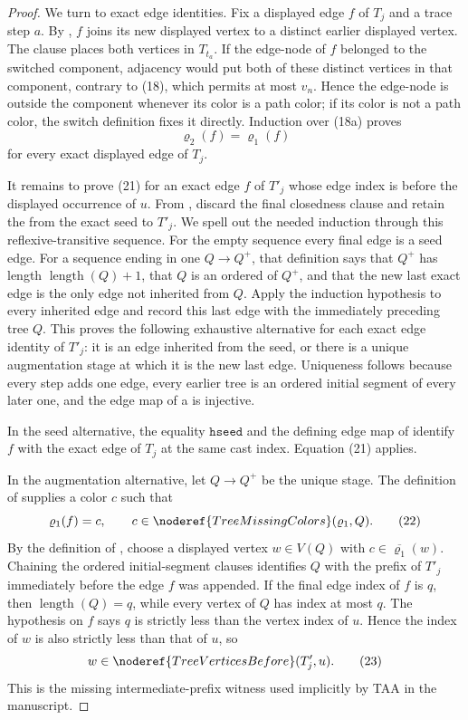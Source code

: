 \begin{proof}
We turn to exact edge identities.  Fix a displayed edge \(f\) of \(T_j\)
and a trace step \(a\).  By , \(f\) joins its new
displayed vertex to a distinct earlier displayed vertex.  The
 clause places both vertices in
\(T_{t_a}\).  If the edge-node of \(f\) belonged to the switched
component, adjacency would put both of these distinct vertices in that
component, contrary to (18), which permits at most \(v_n\).  Hence the
edge-node is outside the component whenever its color is a path color;
if its color is not a path color, the switch definition fixes it directly.
Induction over (18a) proves
\[
                    \varrho_2(f)=\varrho_1(f)               \tag{21}
\]
for every exact displayed edge of \(T_j\).

It remains to prove (21) for an exact edge \(f\) of \(T'_j\) whose edge
index is before the displayed occurrence of \(u\).  From
, discard the final closedness clause and retain
the  from the exact seed to
\(T'_j\).  We spell out the needed induction through this
reflexive-transitive sequence.  For the empty sequence every final edge
is a seed edge.  For a sequence ending in one
 \(Q\to Q^+\), that definition says that
\(Q^+\) has length \(\operatorname{length}(Q)+1\), that \(Q\) is an
ordered  of \(Q^+\), and that the
new last exact edge is the only edge not inherited from \(Q\).  Apply the
induction hypothesis to every inherited edge and record this last edge
with the immediately preceding tree \(Q\).  This proves the following
exhaustive alternative for each exact edge identity of \(T'_j\): it is an
edge inherited from the seed, or there is a unique augmentation stage at
which it is the new last edge.  Uniqueness follows because every step adds
one edge, every earlier tree is an ordered initial segment of every later
one, and the edge map of a  is injective.

In the seed alternative, the equality
\(\mathtt{hseed}\) and the defining edge map of
 identify \(f\) with the exact edge of
\(T_j\) at the same cast index.  Equation (21) applies.

In the augmentation alternative, let \(Q\to Q^+\) be the unique stage.
The definition of  supplies a color \(c\)
such that
\[
              \varrho_1(f)=c,\qquad
              c\in\noderef{TreeMissingColors}(\varrho_1,Q). \tag{22}
\]
By the definition of , choose a displayed
vertex \(w\in V(Q)\) with
\(c\in\overline{\varrho_1}(w)\).  Chaining the ordered initial-segment
clauses identifies \(Q\) with the prefix of \(T'_j\) immediately before
the edge \(f\) was appended.  If the final edge index of \(f\) is \(q\),
then \(\operatorname{length}(Q)=q\), while every vertex of \(Q\) has
index at most \(q\).  The hypothesis on \(f\) says \(q\) is strictly less
than the vertex index of \(u\).  Hence the index of \(w\) is also strictly
less than that of \(u\), so
\[
              w\in\noderef{TreeVerticesBefore}(T'_j,u).      \tag{23}
\]
This is the missing intermediate-prefix witness used implicitly by TAA
in the manuscript.


\end{proof}
